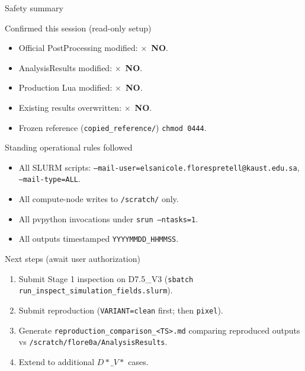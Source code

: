 \documentclass[aspectratio=169]{beamer}
\newcommand{\xmark}{\textcolor{error}{$\times$}}
\begin{document}
\begin{frame}{Safety summary}
\begin{block}{Confirmed this session (read-only setup)}
\begin{itemize}
  \item Official PostProcessing modified: \xmark\ \textbf{NO}.
  \item AnalysisResults modified: \xmark\ \textbf{NO}.
  \item Production Lua modified: \xmark\ \textbf{NO}.
  \item Existing results overwritten: \xmark\ \textbf{NO}.
  \item Frozen reference (\texttt{copied\_reference/}) \texttt{chmod 0444}.
\end{itemize}
\end{block}

\begin{block}{Standing operational rules followed}
\begin{itemize}
  \item All SLURM scripts: \texttt{--mail-user=elsanicole.florespretell@kaust.edu.sa},
        \texttt{--mail-type=ALL}.
  \item All compute-node writes to \texttt{/scratch/} only.
  \item All pvpython invocations under \texttt{srun --ntasks=1}.
  \item All outputs timestamped \texttt{YYYYMMDD\_HHMMSS}.
\end{itemize}
\end{block}
\end{frame}

\begin{frame}{Next steps (await user authorization)}
\begin{enumerate}
  \item Submit Stage 1 inspection on D7.5\_V3 (\texttt{sbatch run\_inspect\_simulation\_fields.slurm}).
  \item Submit reproduction (\texttt{VARIANT=clean} first; then \texttt{pixel}).
  \item Generate \texttt{reproduction\_comparison\_<TS>.md} comparing reproduced
        outputs vs \texttt{/scratch/flore0a/AnalysisResults}.
  \item Extend to additional \(D*\_V*\) cases.
\end{enumerate}
\end{frame}
\end{document}
